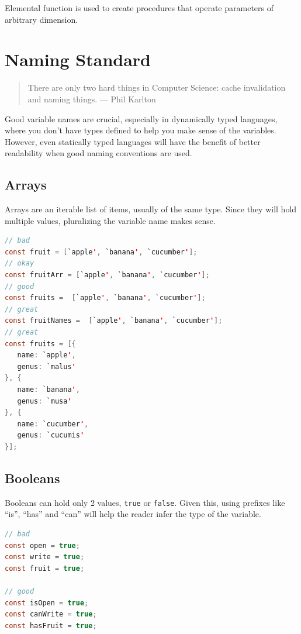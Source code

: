 \documentclass[11pt]{book} %
\begin{document}
Elemental function is used to create procedures that operate parameters of arbitrary dimension.


\section{Naming Standard}
\begin{quote}
There are only two hard things in Computer Science: cache invalidation and naming things. --- Phil Karlton
\end{quote}

Good variable names are crucial, especially in dynamically typed languages, where you don't have types defined to help you make sense of the variables. However, even statically typed languages will have the benefit of better readability when good naming conventions are used.

\subsection{Arrays}

Arrays are an iterable list of items, usually of the same type. Since they will hold multiple values, pluralizing the variable name makes sense.

\begin{lstlisting}[language=java, caption=Array names]
// bad
const fruit = [`apple', `banana', `cucumber'];
// okay
const fruitArr = [`apple', `banana', `cucumber'];
// good
const fruits =  [`apple', `banana', `cucumber'];
// great
const fruitNames =  [`apple', `banana', `cucumber'];
// great
const fruits = [{
   name: `apple',
   genus: `malus'
}, {
   name: `banana',
   genus: `musa'
}, {
   name: `cucumber',
   genus: `cucumis'   
}];
\end{lstlisting}

\subsection{Booleans}

Booleans can hold only 2 values, \verb|true| or \verb|false|. Given this, using prefixes like ``is'', ``has'' and ``can'' will help the reader infer the type of the variable.

\begin{lstlisting}[language=java, caption=Booleans names]
// bad
const open = true;
const write = true;
const fruit = true;

// good
const isOpen = true;
const canWrite = true;
const hasFruit = true;
\end{lstlisting}
\end{document}
